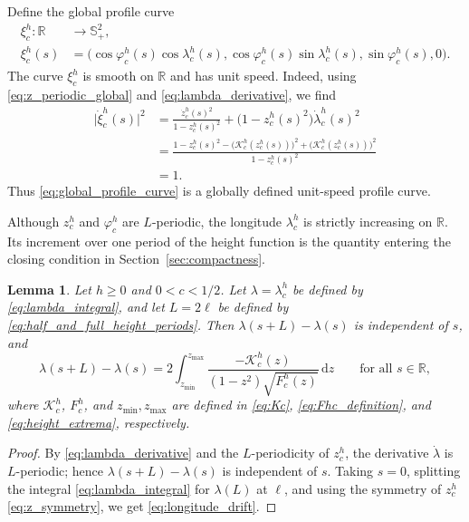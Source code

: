 \documentclass[a4paper,11pt]{amsart}
\numberwithin{equation}{section}
\theoremstyle{plain}
\newtheorem{lem}[thm]{Lemma}
\newcommand{\dif}{\mathrm{d}}
\begin{document}
Define the global profile curve
\begin{equation}\label{eq:global_profile_curve}
\begin{aligned}
\xi_c^h:\mathbb R&\longrightarrow\mathbb S^2_+,\\
\xi_c^h(s)
&=
\bigl(
\cos\varphi_c^h(s)\cos\lambda_c^h(s),
\cos\varphi_c^h(s)\sin\lambda_c^h(s),
\sin\varphi_c^h(s),
0
\bigr).
\end{aligned}
\end{equation}
The curve $\xi_c^h$ is smooth on $\mathbb R$ and has unit speed. Indeed,
using \eqref{eq:z_periodic_global} and \eqref{eq:lambda_derivative}, we find
\[
\begin{aligned}
\lvert\dot\xi_c^h(s)\rvert^2
&=
\frac{\dot z_c^h(s)^2}{1-z_c^h(s)^2}
+
\bigl(1-z_c^h(s)^2\bigr)\dot\lambda_c^h(s)^2\\
&=
\frac{
1-z_c^h(s)^2-\bigl(\mathcal K_c^h(z_c^h(s))\bigr)^2
+\bigl(\mathcal K_c^h(z_c^h(s))\bigr)^2
}{1-z_c^h(s)^2}\\
&=1.
\end{aligned}
\]
Thus \eqref{eq:global_profile_curve} is a globally defined unit-speed
profile curve.

Although $z_c^h$ and $\varphi_c^h$ are $L$-periodic, the longitude
$\lambda_c^h$ is strictly increasing on $\mathbb R$. Its increment over one period of the height function is the quantity
entering the closing condition in Section~\ref{sec:compactness}.

\begin{lem}\label{lem:longitude_increment}
Let $h\geq0$ and $0<c<1/2$. Let $\lambda=\lambda_c^h$ be defined by
\eqref{eq:lambda_integral}, and let $L=2\ell$ be defined by
\eqref{eq:half_and_full_height_periods}. Then
$\lambda(s+L)-\lambda(s)$ is independent of $s$, and
\begin{equation}\label{eq:longitude_drift}
\lambda(s+L)-\lambda(s)
=
2\int_{z_{\min}}^{z_{\max}}
\frac{-\mathcal K_c^h(z)}
     {(1-z^2)\sqrt{F_c^h(z)}}\,\dif z
\qquad
\text{for all }s\in\mathbb R,
\end{equation}
where $\mathcal K_c^h$, $F_c^h$, and $z_{\min},z_{\max}$ are defined
in \eqref{eq:Kc}, \eqref{eq:Fhc_definition}, and
\eqref{eq:height_extrema}, respectively.
\end{lem}

\begin{proof}
By \eqref{eq:lambda_derivative} and the $L$-periodicity of $z_c^h$,
the derivative $\dot\lambda$ is $L$-periodic; hence
$\lambda(s+L)-\lambda(s)$ is independent of $s$. Taking $s=0$,
splitting the integral \eqref{eq:lambda_integral} for $\lambda(L)$ at $\ell$, and using the symmetry of $z_c^h$ \eqref{eq:z_symmetry}, we get
\eqref{eq:longitude_drift}.
\end{proof}
\end{document}
